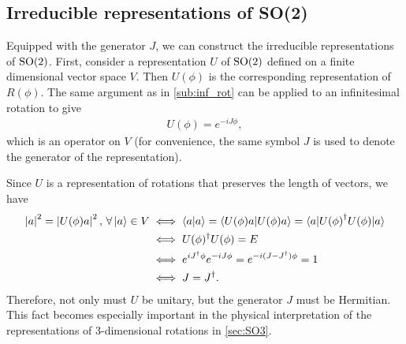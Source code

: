     \subsection{Irreducible representations of SO(2)}\label{sub:irr_so2}
    Equipped with the generator $J$, we can construct the irreducible representations of $\textrm{SO}{(2)}$.
    First, consider a representation $U$ of $\textrm{SO}{(2)}$ defined on a finite dimensional vector space $V$. Then $U(\phi)$ is the corresponding representation of $R(\phi)$. The same argument as in \cref{sub:inf_rot} can be applied to an infinitesimal rotation to give
    \begin{align*}
        U(\phi) = e^{-iJ\phi},
    \end{align*}
    which is an operator on $V$ (for convenience, the same symbol $J$ is used to denote the generator of the representation).

    Since $U$ is a representation of rotations that preserves the length of vectors, we have
    \begin{align*}
        \left|a\right|^2 = \left|U(\phi)a\right|^2, \, \forall \ket{a}\in V &\iff \braket{a|a} = \braket{U(\phi)a|U(\phi)a} = \braket{a|{U(\phi)}^\dagger U(\phi)|a} \\
        &\iff U(\phi)^\dagger U(\phi) = E \\
        &\iff e^{iJ^\dagger\phi}e^{-iJ\phi} = e^{-i(J-J^\dagger)\phi} = 1 \\
        &\iff J = J^\dagger.
    \end{align*}
    Therefore, not only must $U$ be unitary, but the generator $J$ must be Hermitian. This fact becomes especially important in the physical interpretation of the representations of 3-dimensional rotations in \cref{sec:SO3}.

